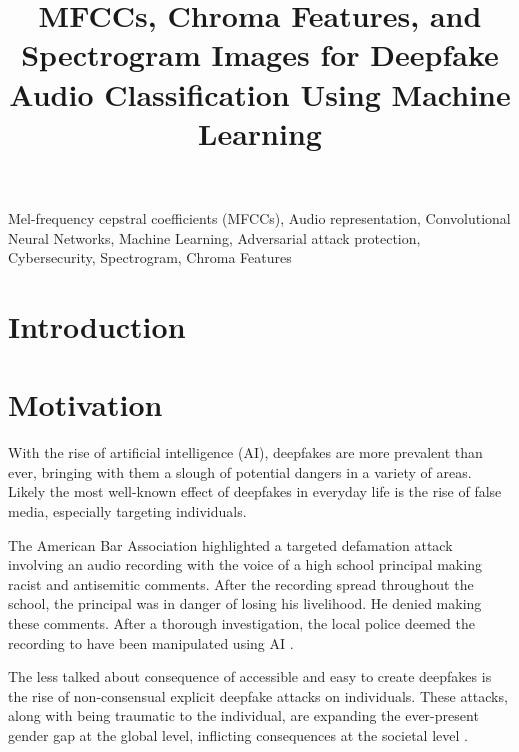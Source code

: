 \documentclass[conference]{IEEEtran}
\begin{document}
\title{MFCCs, Chroma Features, and Spectrogram Images for Deepfake Audio Classification Using Machine Learning}

\author{
}

\maketitle

\begin{abstract}

\end{abstract}

\begin{IEEEkeywords}
Mel-frequency cepstral coefficients (MFCCs),
Audio representation,
Convolutional Neural Networks,
Machine Learning,
Adversarial attack protection, 
Cybersecurity,
Spectrogram, 
Chroma Features
\end{IEEEkeywords}


\section{Introduction}

\section{Motivation}

With the rise of artificial intelligence (AI), deepfakes are more prevalent than ever, bringing with them a slough of potential dangers in a variety of areas. Likely the most well-known effect of deepfakes in everyday life is the rise of false media, especially targeting individuals. 

The American Bar Association highlighted a targeted defamation attack involving an audio recording with the voice of a high school principal making racist and antisemitic comments. After the recording spread throughout the school, the principal was in danger of losing his livelihood. He denied making these comments. After a thorough investigation, the local police deemed the recording to have been manipulated using AI \cite{b5}. 

The less talked about consequence of accessible and easy to create deepfakes is the rise of non-consensual explicit deepfake attacks on individuals. These attacks, along with being traumatic to the individual, are expanding the ever-present gender gap at the global level, inflicting consequences at the societal level \cite{b3}.
\end{document}
